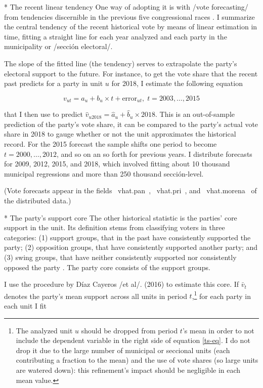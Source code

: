 \documentclass[letter,12pt]{article}
\begin{document}
* The recent linear tendency
One way of adopting it is with /vote forecasting/ from tendencies discernible in the previous five congressional races \citep{magar.gubCoatMx.2012}. I summarize the central tendency of the recent historical vote by means of linear estimation in time, fitting a straight line for each year analyzed and each party in the municipality or /sección electoral/. 

The slope of the fitted line (the tendency) serves to extrapolate the party's electoral support to the future. For instance, to get the vote share that the recent past predicts for a party in unit $u$ for 2018, I estimate the following equation 

\begin{equation}
v_{ut} = a_u + b_u \times t + \text{error}_{ut}, \; t = 2003, \ldots, 2015
\end{equation}\label{ts-eq}

that I then use to predict $\hat{v}_{u2018} = \hat{a}_u + \hat{b}_u \times 2018$. This is an out-of-sample prediction of the party's vote share, it can be compared to the party's actual vote share in 2018 to gauge whether or not the unit approximates the historical record. For the 2015 forecast the sample shifts one period to become $t = 2000, \ldots, 2012$, and so on an so forth for previous years. I distribute forecasts for 2009, 2012, 2015, and 2018, which involved fitting about 10 thousand municipal regressions and more than 250 thousand sección-level.

(Vote forecasts appear in the fields ~vhat.pan~, ~vhat.pri~, and ~vhat.morena~ of the distributed data.)

* The party's support core
The other historical statistic is the parties' core support in the unit. Its definition stems from classifying voters in three categories: (1) support groups, that in the past have consistently supported the party; (2) opposition groups, that have consistently supported another party; and (3) swing groups, that have neither consistently supported nor consistently opposed the party \citep{cox.mccubbins.1986}. The party core consists of the support groups. 

I use the procedure by Díaz Cayeros /et al/. (2016) to estimate this core. If $\bar{v}_t$ denotes the party's mean support across all units in period $t$,\footnote{The analyzed unit $u$ should be dropped from period $t$'s mean in order to not include the dependent variable in the right side of equation \ref{ts-eq}. I do not drop it due to the large number of municipal or seccional units (each contributing a fraction to the mean) and the use of vote shares (so large units are watered down): this refinement's impact should be negligible in each mean value.} for each party in each unit I fit
\end{document}
